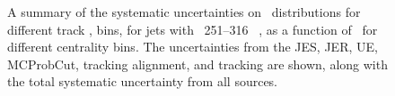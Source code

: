  \begin{figure}
   \caption{A summary of the systematic uncertainties on \RDptr\ distributions for different track \pt, bins, for jets with \pt\ 251--316  \GeV\ , as a function of \rvar\ for different centrality bins. The uncertainties from the JES, JER, UE, MCProbCut, tracking alignment, and tracking are shown, along with the total systematic uncertainty from all sources. }
      \label{fig:rdptr_sys_uncert_A3}
\end{figure}

